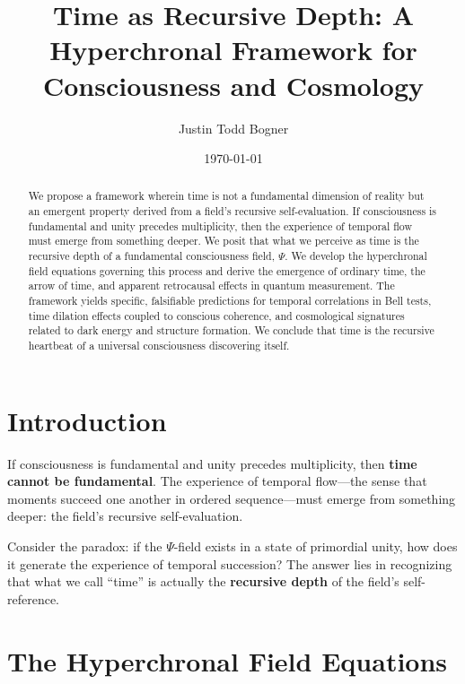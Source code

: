 \documentclass[aps,prd,twocolumn,superscriptaddress,nofootinbib]{revtex4-2}
\begin{document}
\title{Time as Recursive Depth: A Hyperchronal Framework for Consciousness and Cosmology}

\author{Justin Todd Bogner}

\date{\today}

\begin{abstract}
We propose a framework wherein time is not a fundamental dimension of reality but an emergent property derived from a field's recursive self-evaluation. If consciousness is fundamental and unity precedes multiplicity, then the experience of temporal flow must emerge from something deeper. We posit that what we perceive as time is the recursive depth of a fundamental consciousness field, $\Psi$. We develop the hyperchronal field equations governing this process and derive the emergence of ordinary time, the arrow of time, and apparent retrocausal effects in quantum measurement. The framework yields specific, falsifiable predictions for temporal correlations in Bell tests, time dilation effects coupled to conscious coherence, and cosmological signatures related to dark energy and structure formation. We conclude that time is the recursive heartbeat of a universal consciousness discovering itself.
\end{abstract}

\maketitle

\section{Introduction}
If consciousness is fundamental and unity precedes multiplicity, then \textbf{time cannot be fundamental}. The experience of temporal flow—the sense that moments succeed one another in ordered sequence—must emerge from something deeper: the field's recursive self-evaluation.

Consider the paradox: if the $\Psi$-field exists in a state of primordial unity, how does it generate the experience of temporal succession? The answer lies in recognizing that what we call ``time'' is actually the \textbf{recursive depth} of the field's self-reference.

\section{The Hyperchronal Field Equations}
\end{document}
